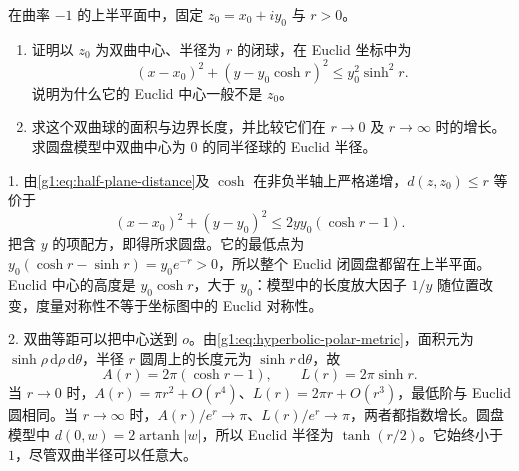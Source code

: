 \BookExercises

\begin{exercise}
	\label{g1:ex:hyperbolic-metric-balls}
	在曲率 \(-1\) 的上半平面中，固定 \(z_0=x_0+iy_0\) 与 \(r>0\)。
	\begin{enumerate}
		\item 证明以 \(z_0\) 为双曲中心、半径为 \(r\) 的闭球，在 Euclid 坐标中为
		\[
			(x-x_0)^2+(y-y_0\cosh r)^2\leq y_0^2\sinh^2r.
		\]
		说明为什么它的 Euclid 中心一般不是 \(z_0\)。
		\item 求这个双曲球的面积与边界长度，并比较它们在 \(r\to0\) 及 \(r\to\infty\) 时的增长。求圆盘模型中双曲中心为 \(0\) 的同半径球的 Euclid 半径。
	\end{enumerate}
\end{exercise}
\begin{solution}
	1. 由\eqref{g1:eq:half-plane-distance}及 \(\cosh\) 在非负半轴上严格递增，\(d(z,z_0)\leq r\) 等价于
	\[
		(x-x_0)^2+(y-y_0)^2\leq2yy_0(\cosh r-1).
	\]
	把含 \(y\) 的项配方，即得所求圆盘。它的最低点为 \(y_0(\cosh r-\sinh r)=y_0e^{-r}>0\)，所以整个 Euclid 闭圆盘都留在上半平面。Euclid 中心的高度是 \(y_0\cosh r\)，大于 \(y_0\)：模型中的长度放大因子 \(1/y\) 随位置改变，度量对称性不等于坐标图中的 Euclid 对称性。

	2. 双曲等距可以把中心送到 \(o\)。由\eqref{g1:eq:hyperbolic-polar-metric}，面积元为 \(\sinh\rho\,\mathrm{d}\rho\,\mathrm{d}\theta\)，半径 \(r\) 圆周上的长度元为 \(\sinh r\,\mathrm{d}\theta\)，故
	\[
		A(r)=2\pi(\cosh r-1),\qquad L(r)=2\pi\sinh r.
	\]
	当 \(r\to0\) 时，\(A(r)=\pi r^2+O(r^4)\)、\(L(r)=2\pi r+O(r^3)\)，最低阶与 Euclid 圆相同。当 \(r\to\infty\) 时，\(A(r)/e^r\to\pi\)、\(L(r)/e^r\to\pi\)，两者都指数增长。圆盘模型中 \(d(0,w)=2\operatorname{artanh}|w|\)，所以 Euclid 半径为 \(\tanh(r/2)\)。它始终小于 \(1\)，尽管双曲半径可以任意大。
\end{solution}

